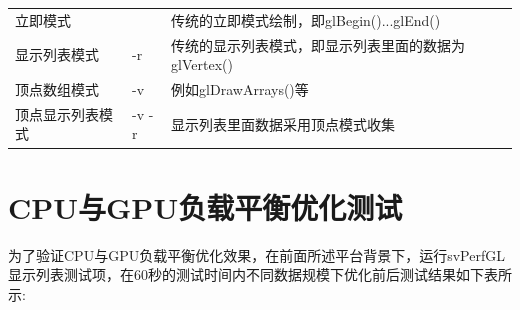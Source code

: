 \begin{center}  
\tablelasttail{\bottomrule}

\begin{supertabular}{p{4.cm}<{\centering}p{2.cm}<{\centering}p{9.cm}<{\centering}}
	立即模式 & & 传统的立即模式绘制，即glBegin()...glEnd()\\
    显示列表模式 & -r & 传统的显示列表模式，即显示列表里面的数据为glVertex() \\
	顶点数组模式 & -v & 例如glDrawArrays()等 \\
	顶点显示列表模式 & -v -r & 显示列表里面数据采用顶点模式收集 \\
\end{supertabular}
\end{center}


\section{CPU与GPU负载平衡优化测试}
为了验证CPU与GPU负载平衡优化效果，在前面所述平台背景下，运行svPerfGL显示列表测试项，在60秒的测试时间内不同数据规模下优化前后测试结果如下表所示:

